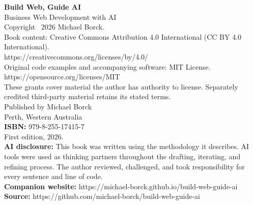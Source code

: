 \thispagestyle{empty}
\vspace*{\fill}

\begin{flushleft}
\textbf{Build Web, Guide AI}\\
Business Web Development with AI\\[1.5em]
Copyright \textcopyright\ 2026 Michael Borck.\\[1em]
Book content: Creative Commons Attribution 4.0 International (CC BY 4.0 International).\\
https://creativecommons.org/licenses/by/4.0/\\[0.5em]
Original code examples and accompanying software: MIT License.\\
https://opensource.org/licenses/MIT\\[0.5em]
These grants cover material the author has authority to license. Separately credited third-party material retains its stated terms.\\[1em]
Published by Michael Borck\\
Perth, Western Australia\\[1em]
\textbf{ISBN:} 979-8-255-17415-7\\[1em]
First edition, 2026.\\[1em]
\textbf{AI disclosure:} This book was written using the methodology it describes. AI tools were used as thinking partners throughout the drafting, iterating, and refining process. The author reviewed, challenged, and took responsibility for every sentence and line of code.\\[1em]
\textbf{Companion website:} https://michael-borck.github.io/build-web-guide-ai\\
\textbf{Source:} https://github.com/michael-borck/build-web-guide-ai
\end{flushleft}

\vspace*{\fill}
\clearpage
